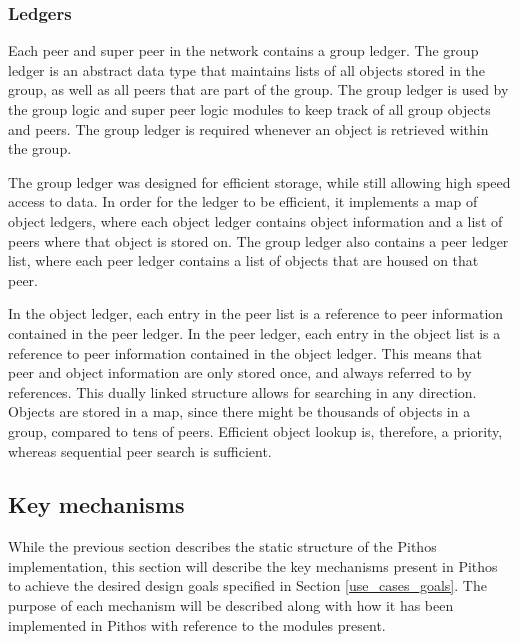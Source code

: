 \subsubsection{Ledgers}
\label{pithos_module_types_ledgers}

Each peer and super peer in the network contains a group ledger. The group ledger is an abstract data type that maintains lists of all objects stored in the group, as well as all peers that are part of the group. The group ledger is used by the group logic and super peer logic modules to keep track of all group objects and peers. The group ledger is required whenever an object is retrieved within the group.

The group ledger was designed for efficient storage, while still allowing high speed access to data. In order for the ledger to be efficient, it implements a map of object ledgers, where each object ledger contains object information and a list of peers where that object is stored on. The group ledger also contains a peer ledger list, where each peer ledger contains a list of objects that are housed on that peer.

In the object ledger, each entry in the peer list is a reference to peer information contained in the peer ledger. In the peer ledger, each entry in the object list is a reference to peer information contained in the object ledger. This means that peer and object information are only stored once, and always referred to by references. This dually linked structure allows for searching in any direction. Objects are stored in a map, since there might be thousands of objects in a group, compared to tens of peers. Efficient object lookup is, therefore, a priority, whereas sequential peer search is sufficient.

\subsection{Key mechanisms}
\label{key_mechanisms}


While the previous section describes the static structure of the Pithos implementation, this section will describe the key mechanisms present in Pithos to achieve the desired design goals specified in Section \ref{use_cases_goals}. The purpose of each mechanism will be described along with how it has been implemented in Pithos with reference to the modules present.

